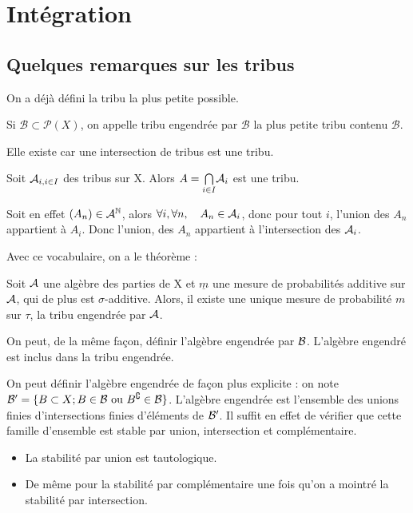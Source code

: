 \documentclass[10pt,a4paper,notitlepage ]{report}
\begin{document}
\chapter{Intégration}

\section{Quelques remarques sur les tribus}

On a déjà défini la tribu la plus petite possible. 

\begin{definition}
Si $\mathcal{B} \subset \mathcal{P} (X)$, on appelle tribu engendrée par $\mathcal{B}$ la plus petite tribu contenu $\mathcal{B}$.
\end{definition}

\begin{lemme}
Elle existe car une intersection de tribus est une tribu.
\end{lemme}

\begin{demo}
Soit $\mathcal A_{i, i \in I}$ des tribus sur X. Alors $A = \underset{i \in I} \bigcap \mathcal A_i $ est une tribu.

Soit en effet $(A_n) \in \mathcal A^\mathbb N$, alors $\forall i, \forall n, \quad A_n \in \mathcal A_i $, donc pour tout $i$, l'union des $A_n$ appartient à $A_i$. Donc l'union, des $A_n$ appartient à l'intersection des $\mathcal A_i$.
\end{demo}

Avec ce vocabulaire, on a le théorème :

\begin{theorem}
Soit $\mathcal A$ une algèbre des parties de X et $\underline{m}$ une mesure de probabilités additive sur $\mathcal A$, qui de plus est $\sigma$-additive. Alors, il existe une unique mesure de probabilité $m$ sur $\tau$, la tribu engendrée par $\mathcal A$.
\end{theorem}

On peut, de la même façon, définir l'algèbre engendrée par $\mathcal B$.  L'algèbre engendré est inclus dans la tribu engendrée.

On peut définir l'algèbre engendrée de façon plus explicite : on note $\mathcal B' = \lbrace B \subset X ; B \in \mathcal B \text{ ou } B^\complement \in \mathcal B \rbrace $. L'algèbre engendrée est l'ensemble des unions finies d'intersections finies d'éléments de $\mathcal B'$. Il suffit en effet de vérifier que cette famille d'ensemble est stable par union, intersection et complémentaire. 
\begin{itemize}
	\item La stabilité par union est tautologique.
	\item De même pour la stabilité par complémentaire une fois qu'on a mointré la stabilité par intersection.
\end{itemize}
\end{document}
